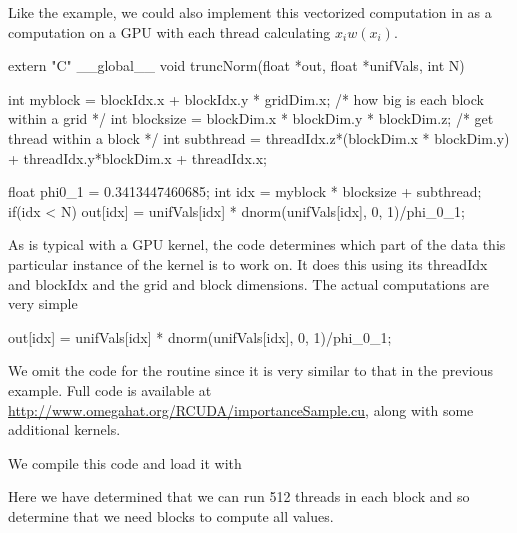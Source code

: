 Like the  example, we could also implement this
vectorized computation in \R{} as a computation on a GPU
with each thread calculating $x_i w(x_i)$.
\begin{CCode}
extern "C"
__global__ void truncNorm(float *out, float *unifVals, int N)
{
    int myblock = blockIdx.x + blockIdx.y * gridDim.x;
           /* how big is each block within a grid */
    int blocksize = blockDim.x * blockDim.y * blockDim.z;
            /* get thread within a block */
    int subthread = threadIdx.z*(blockDim.x * blockDim.y) + 
                     threadIdx.y*blockDim.x + threadIdx.x;

    float phi0_1 = 0.3413447460685;
    int idx = myblock * blocksize + subthread;
    if(idx < N) {
       out[idx] = unifVals[idx] * dnorm(unifVals[idx], 0, 1)/phi_0_1;
    }
}
\end{CCode}
As is typical with a GPU kernel, the code determines
which part of the data this particular instance of the kernel is to
work on. It does this using its threadIdx and blockIdx and 
the grid and block dimensions.
The actual computations are very simple
\begin{CCode}
out[idx] = unifVals[idx] * dnorm(unifVals[idx], 0, 1)/phi_0_1;
\end{CCode}
We omit the code for the  routine since it is very
similar to that in the previous example. Full code is 
available at \url{http://www.omegahat.org/RCUDA/importanceSample.cu},
along with some additional kernels.

We compile this code and load it with
Here we have determined that we can run 512 threads in each block
and so determine that we need  blocks to compute
all   values.

